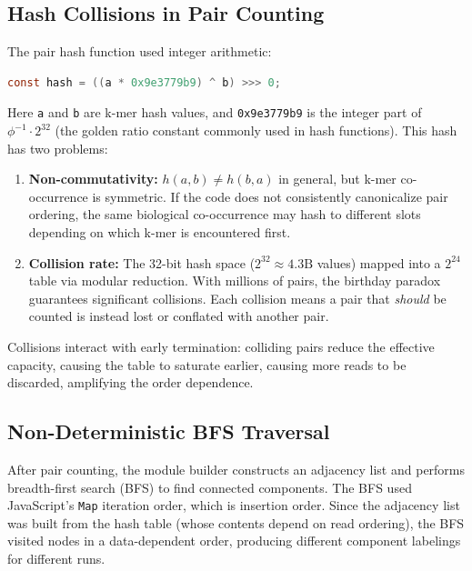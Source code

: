 \documentclass{../yalumba}
\begin{document}
\subsection{Hash Collisions in Pair Counting}

The pair hash function used integer arithmetic:

\begin{lstlisting}[language=Java,caption={The collision-prone pair hash.}]
const hash = ((a * 0x9e3779b9) ^ b) >>> 0;
\end{lstlisting}

Here \texttt{a} and \texttt{b} are k-mer hash values, and \texttt{0x9e3779b9}
is the integer part of $\phi^{-1} \cdot 2^{32}$ (the golden ratio constant
commonly used in hash functions). This hash has two problems:

\begin{enumerate}[leftmargin=2em]
  \item \textbf{Non-commutativity:} $h(a, b) \neq h(b, a)$ in general, but
    k-mer co-occurrence is symmetric. If the code does not consistently canonicalize
    pair ordering, the same biological co-occurrence may hash to different slots
    depending on which k-mer is encountered first.
  \item \textbf{Collision rate:} The 32-bit hash space ($2^{32} \approx 4.3\text{B}$
    values) mapped into a $2^{24}$ table via modular reduction. With millions of
    pairs, the birthday paradox guarantees significant collisions. Each collision
    means a pair that \textit{should} be counted is instead lost or conflated
    with another pair.
\end{enumerate}

Collisions interact with early termination: colliding pairs reduce the effective
capacity, causing the table to saturate earlier, causing more reads to be
discarded, amplifying the order dependence.

\subsection{Non-Deterministic BFS Traversal}

After pair counting, the module builder constructs an adjacency list and performs
breadth-first search (BFS) to find connected components. The BFS used JavaScript's
\texttt{Map} iteration order, which is insertion order. Since the adjacency list
was built from the hash table (whose contents depend on read ordering), the BFS
visited nodes in a data-dependent order, producing different component labelings
for different runs.
\end{document}
